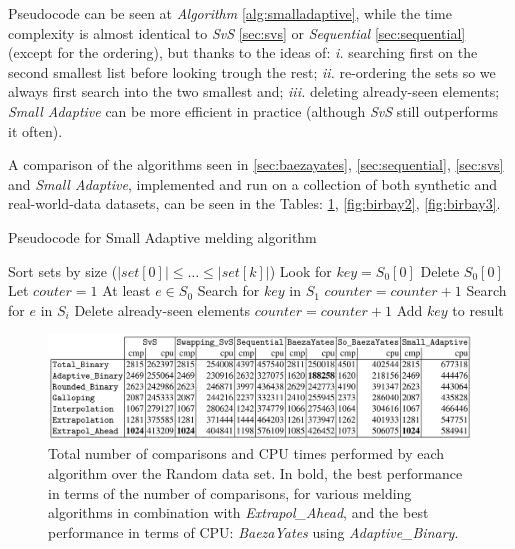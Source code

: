 Pseudocode can be seen at \textit{Algorithm} \ref{alg:smalladaptive}, while the time complexity is almost identical to \textit{SvS} \ref{sec:svs} or \textit{Sequential} \ref{sec:sequential} (except for the ordering), but thanks to the ideas of: \textit{i.} searching first on the second smallest list before looking trough the rest; \textit{ii.} re-ordering the sets so we always first search into the two smallest and; \textit{iii.} deleting already-seen elements; \textit{Small Adaptive} can be more efficient in practice (although \textit{SvS} still outperforms it often). 

A comparison of the algorithms seen in \ref{sec:baezayates}, \ref{sec:sequential}, \ref{sec:svs} and \textit{Small Adaptive}, implemented and run on a collection of both synthetic and real-world-data datasets, can be seen in the Tables: \ref{fig:birbay1}, \ref{fig:birbay2}, \ref{fig:birbay3}.

\begin{algorithm}
    \captionsetup{labelsep=newline}
    \caption{Pseudocode for Small Adaptive melding algorithm \label{alg:smalladaptive}}
    \begin{algorithmic}[1]
            \State Sort sets by size \big($\big|set[0]\big| \leq \ldots \leq \big|set[k]\big|$\big)
            \State Look for $key=S_0[0]$
            \State Delete $S_0[0]$
            \State Let $couter=1$ \Comment At least $e \in S_0$ 
            \State Search for $key$ in $S_1$
                \State $counter=counter+1$
                    \State Search for $e$ in $S_i$
                    \State Delete already-seen elements 
                        \State $counter=counter+1$
                    \EndIf
                \EndFor
            \EndIf
                \State Add $key$ to result
            \EndIf
        \EndWhile
    \end{algorithmic}
\end{algorithm}

\begin{figure}[h] 
    \begin{center}
        \includegraphics[width=.8\textwidth]{imgs/birbay_table3.png}
        \caption{Total number of comparisons and CPU times performed by each algorithm over the Random data set. In bold, the best
        performance in terms of the number of comparisons, for various melding algorithms in combination with \textit{Extrapol\_Ahead}, and
        the best performance in terms of CPU: \textit{BaezaYates} using \textit{Adaptive\_Binary}. \citep{birbay_ortiz} \label{fig:birbay1}}
    \end{center}
\end{figure}

